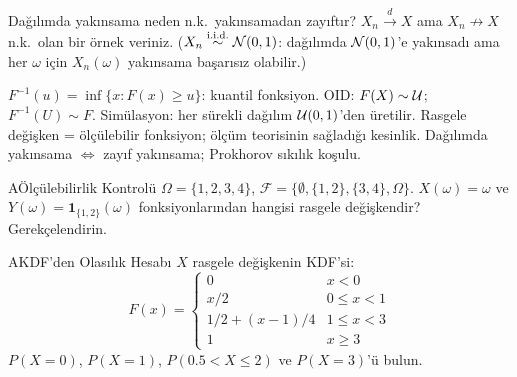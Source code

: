\begin{kritiksorgu}
Dağılımda yakınsama neden n.k.\ yakınsamadan zayıftır? $X_n\overset{d}{\to}X$ ama $X_n\not\to X$ n.k.\ olan bir örnek veriniz. ($X_n\overset{\text{i.i.d.}}{\sim}\mathcal{N}(0,1)$: dağılımda $\mathcal{N}(0,1)$'e yakınsadı ama her $\omega$ için $X_n(\omega)$ yakınsama başarısız olabilir.)
\end{kritiksorgu}

\begin{mikroozet}
$F^{-1}(u) = \inf\{x: F(x)\geq u\}$: kuantil fonksiyon.
OID: $F(X)\sim\mathcal{U}$; $F^{-1}(U)\sim F$.
Simülasyon: her sürekli dağılım $\mathcal{U}(0,1)$'den üretilir.
Rasgele değişken = ölçülebilir fonksiyon; ölçüm teorisinin sağladığı kesinlik.
Dağılımda yakınsama $\iff$ zayıf yakınsama; Prokhorov sıkılık koşulu.
\end{mikroozet}


\cozumlualistirmalar

\begin{alistirma}[Al.3.1]{A}{Ölçülebilirlik Kontrolü}
$\Omega = \{1, 2, 3, 4\}$, $\mathcal{F} = \{\emptyset, \{1,2\}, \{3,4\}, \Omega\}$.
$X(\omega) = \omega$ ve $Y(\omega) = \mathbf{1}_{\{1,2\}}(\omega)$ fonksiyonlarından
hangisi rasgele değişkendir? Gerekçelendirin.
\end{alistirma}

\begin{alistirma}[Al.3.2]{A}{KDF'den Olasılık Hesabı}
$X$ rasgele değişkenin KDF'si:
\[
  F(x) = \begin{cases} 0 & x < 0 \\ x/2 & 0 \leq x < 1 \\ 1/2 + (x-1)/4 & 1 \leq x < 3 \\ 1 & x \geq 3 \end{cases}
\]
$P(X = 0)$, $P(X = 1)$, $P(0.5 < X \leq 2)$ ve $P(X = 3)$'ü bulun.
\end{alistirma}

